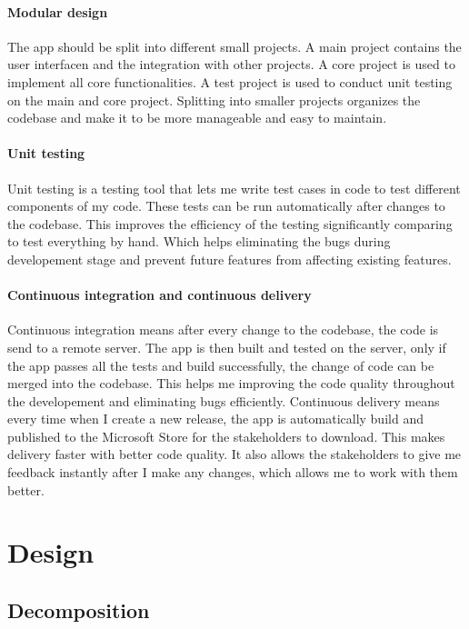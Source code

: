 \documentclass[a4paper]{report}
\begin{document}
\subsubsection{Modular design}

The app should be split into different small projects. A main project contains the user interfacen and the integration with other projects. A core project is used to implement all core functionalities. A test project is used to conduct unit testing on the main and core project. Splitting into smaller projects organizes the codebase and make it to be more manageable and easy to maintain.

\subsubsection{Unit testing}

Unit testing is a testing tool that lets me write test cases in code to test different components of my code. These tests can be run automatically after changes to the codebase. This improves the efficiency of the testing significantly comparing to test everything by hand. Which helps eliminating the bugs during developement stage and prevent future features from affecting existing features.

\subsubsection{Continuous integration and continuous delivery}

Continuous integration means after every change to the codebase, the code is send to a remote server. The app is then built and tested on the server, only if the app passes all the tests and build successfully, the change of code can be merged into the codebase. This helps me improving the code quality throughout the developement and eliminating bugs efficiently. Continuous delivery means every time when I create a new release, the app is automatically build and published to the Microsoft Store for the stakeholders to download. This makes delivery faster with better code quality. It also allows the stakeholders to give me feedback instantly after I make any changes, which allows me to work with them better.

\chapter{Design}
\section{Decomposition}
\end{document}
